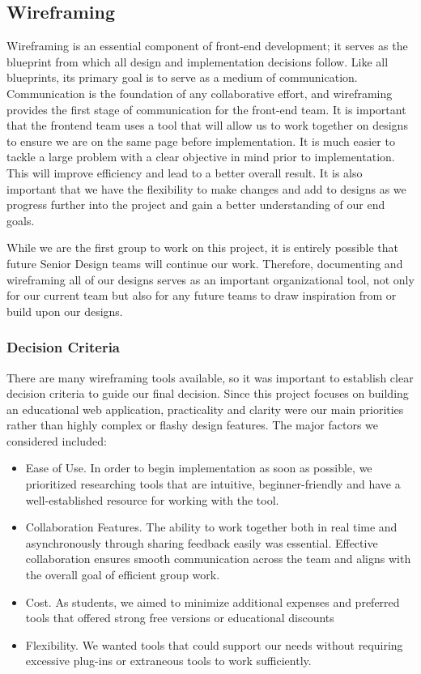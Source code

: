 \documentclass[12pt]{article}
\begin{document}
\subsection{Wireframing}
Wireframing is an essential component of front-end development; it serves as the blueprint from which all design and implementation decisions follow.  Like all blueprints, its primary goal is to serve as a medium of communication. Communication is the foundation of any collaborative effort, and wireframing provides the first stage of communication for the front-end team. It is important that the frontend team uses a tool that will allow us to work together on designs to ensure we are on the same page before implementation. It is much easier to tackle a large problem with a clear objective in mind prior to implementation. This will improve efficiency and lead to a better overall result. It is also important that we have the flexibility to make changes and add to designs as we progress further into the project and gain a better understanding of our end goals.

While we are the first group to work on this project, it is entirely possible that future Senior Design teams will continue our work. Therefore, documenting and wireframing all of our designs serves as an important organizational tool, not only for our current team but also for any future teams to draw inspiration from or build upon our designs.

\subsubsection{Decision Criteria}
There are many wireframing tools available, so it was important to establish clear decision criteria to guide our final decision. Since this project focuses on building an educational web application, practicality and clarity were our main priorities rather than highly complex or flashy design features. The major factors we considered included:
\begin{itemize}
	\item Ease of Use. In order to begin implementation as soon as possible, we prioritized researching tools that are intuitive, beginner-friendly and have a well-established resource for working with the tool.
	\item Collaboration Features. The ability to work together both in real time and asynchronously through sharing feedback easily was essential. Effective collaboration ensures smooth communication across the team and aligns with the overall goal of efficient group work.
	\item Cost. As students, we aimed to minimize additional expenses and preferred tools that offered strong free versions or educational discounts
	\item Flexibility. We wanted tools that could support our needs without requiring excessive plug-ins or extraneous tools to work sufficiently.
\end{itemize}
\end{document}
